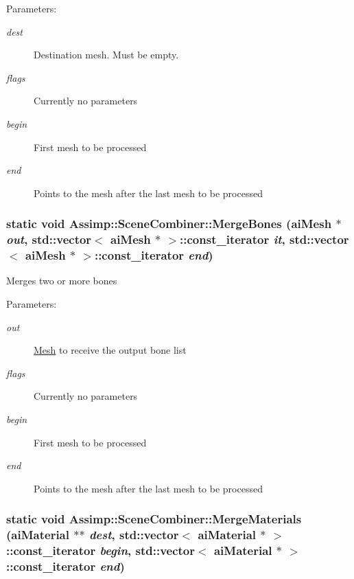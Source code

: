 \begin{Desc}
\item[Parameters:]
\begin{description}
\item[{\em dest}]Destination mesh. Must be empty. \item[{\em flags}]Currently no parameters \item[{\em begin}]First mesh to be processed \item[{\em end}]Points to the mesh after the last mesh to be processed \end{description}
\end{Desc}
\hypertarget{class_assimp_1_1_scene_combiner_a42d5370510db89cbdd739617a617d4e}{
\subsubsection[MergeBones]{\setlength{\rightskip}{0pt plus 5cm}static void Assimp::SceneCombiner::MergeBones ({\bf aiMesh} $\ast$ {\em out}, \/  std::vector$<$ {\bf aiMesh} $\ast$ $>$::const\_\-iterator {\em it}, \/  std::vector$<$ {\bf aiMesh} $\ast$ $>$::const\_\-iterator {\em end})}}
\label{class_assimp_1_1_scene_combiner_a42d5370510db89cbdd739617a617d4e}


Merges two or more bones

\begin{Desc}
\item[Parameters:]
\begin{description}
\item[{\em out}]\hyperlink{class_mesh}{Mesh} to receive the output bone list \item[{\em flags}]Currently no parameters \item[{\em begin}]First mesh to be processed \item[{\em end}]Points to the mesh after the last mesh to be processed \end{description}
\end{Desc}
\hypertarget{class_assimp_1_1_scene_combiner_9ebdb2b454f84032f2cfb51ebd7d5716}{
\subsubsection[MergeMaterials]{\setlength{\rightskip}{0pt plus 5cm}static void Assimp::SceneCombiner::MergeMaterials ({\bf aiMaterial} $\ast$$\ast$ {\em dest}, \/  std::vector$<$ {\bf aiMaterial} $\ast$ $>$::const\_\-iterator {\em begin}, \/  std::vector$<$ {\bf aiMaterial} $\ast$ $>$::const\_\-iterator {\em end})}}
\label{class_assimp_1_1_scene_combiner_9ebdb2b454f84032f2cfb51ebd7d5716}


